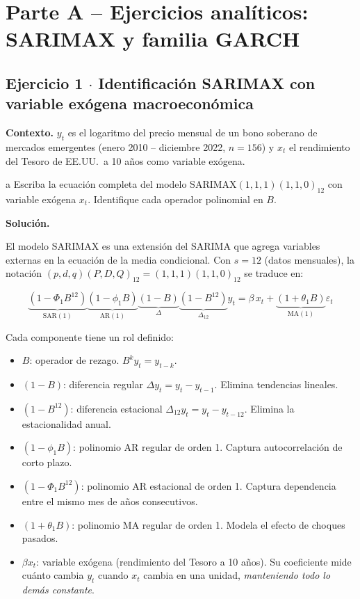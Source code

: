 \documentclass[11pt,a4paper]{article}
\newcommand{\eps}{\varepsilon}
\begin{document}
\section{Parte A -- Ejercicios analíticos: SARIMAX y familia GARCH}

\subsection*{Ejercicio 1 \texorpdfstring{$\cdot$}{·} Identificación SARIMAX con variable exógena macroeconómica}

\textbf{Contexto.} $y_t$ es el logaritmo del precio mensual de un bono soberano de mercados emergentes (enero 2010 -- diciembre 2022, $n=156$) y $x_t$ el rendimiento del Tesoro de EE.UU.\ a 10 años como variable exógena.

\begin{cajaInciso}{a}
Escriba la ecuación completa del modelo SARIMAX$(1,1,1)(1,1,0)_{12}$ con variable exógena $x_t$. Identifique cada operador polinomial en $B$.
\end{cajaInciso}

\textbf{Solución.}

El modelo SARIMAX es una extensión del SARIMA que agrega variables externas en la ecuación de la media condicional. Con $s=12$ (datos mensuales), la notación $(p,d,q)(P,D,Q)_{12}=(1,1,1)(1,1,0)_{12}$ se traduce en:

\[
\underbrace{(1 - \Phi_1 B^{12})}_{\text{SAR}(1)}
\underbrace{(1 - \phi_1 B)}_{\text{AR}(1)}
\underbrace{(1 - B)}_{\Delta}
\underbrace{(1 - B^{12})}_{\Delta_{12}}
y_t
=
\beta\, x_t
+
\underbrace{(1 + \theta_1 B)}_{\text{MA}(1)}
\eps_t
\]

Cada componente tiene un rol definido:
\begin{itemize}[leftmargin=*]
  \item $B$: operador de rezago. $B^k y_t = y_{t-k}$.
  \item $(1-B)$: diferencia regular $\Delta y_t = y_t - y_{t-1}$. Elimina tendencias lineales.
  \item $(1-B^{12})$: diferencia estacional $\Delta_{12}y_t = y_t - y_{t-12}$. Elimina la estacionalidad anual.
  \item $(1-\phi_1 B)$: polinomio AR regular de orden 1. Captura autocorrelación de corto plazo.
  \item $(1-\Phi_1 B^{12})$: polinomio AR estacional de orden 1. Captura dependencia entre el mismo mes de años consecutivos.
  \item $(1+\theta_1 B)$: polinomio MA regular de orden 1. Modela el efecto de choques pasados.
  \item $\beta x_t$: variable exógena (rendimiento del Tesoro a 10 años). Su coeficiente mide cuánto cambia $y_t$ cuando $x_t$ cambia en una unidad, \emph{manteniendo todo lo demás constante}.
\end{itemize}
\end{document}
